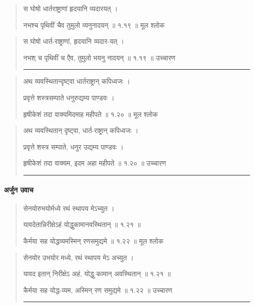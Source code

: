 \begin{quotation} 

स घोषो धार्तराष्ट्राणां हृदयानि व्यदारयत्‌  ।  

नभश्च पृथिवीं चैव तुमुलो व्यनुनादयन्‌  ॥ १.१९ ॥  मूल श्लोक
\end{quotation}

\begin{quotation}

स घोषो धार्त-राष्ट्राणां, हृदयानि व्यदार-यत्  ।  

नभश् च पृथिवीं च एैव, तुमुलो भयनु नादयन्  ॥ १.१९ ॥  उच्चारण

\noindent\rule{16cm}{0.4pt} 
\end{quotation}


\begin{quotation} 

अथ व्यवस्थितान्दृष्ट्वा धार्तराष्ट्रान्‌ कपिध्वजः  ।  

प्रवृत्ते शस्त्रसम्पाते धनुरुद्यम्य पाण्डवः  ।  
 
हृषीकेशं तदा वाक्यमिदमाह महीपते   ॥ १.२० ॥  मूल श्लोक
\end{quotation}

\begin{quotation}

अथ व्यवस्थितान् दृष्ट्वा, धार्त-राष्ट्रान् कपिध्वजः ।  

प्रवृत्ते शस्त्र सम्पाते, धनुर उद्यम्य पाण्डवः  ।  

हृषीकेशं तदा वाक्यम,  इदम अहा महीपते  ॥ १.२० ॥  उच्चारण

\noindent\rule{16cm}{0.4pt} 
\end{quotation}

\paragraph{\sanskrit अर्जुन उवाच}

\begin{quotation} 



सेनयोरुभयोर्मध्ये रथं स्थापय मेऽच्युत  ।  

यावदेतान्निरीक्षेऽहं योद्धुकामानवस्थितान्‌  ॥ १.२१ ॥ 

कैर्मया सह योद्धव्यमस्मिन् रणसमुद्यमे  ॥ १.२२ ॥  मूल श्लोक
\end{quotation}

\begin{quotation}

सेनयोर उभयोर मध्ये, रथं स्थापय मेऽ अच्युत  ।  

यावद इतान् निरीक्षेऽ अहं, योद्धु कामान् अवस्थितान्  ॥ १.२१ ॥ 

कैर्मया सह योद्ध-व्यम, अस्मिन् रण समुद्यमे  ॥ १.२२ ॥  उच्चारण

\noindent\rule{16cm}{0.4pt} 
\end{quotation}


